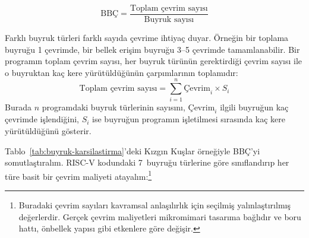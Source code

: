 \begin{equation}
\text{BBÇ} = \frac{\text{Toplam çevrim sayısı}}{\text{Buyruk sayısı}}
\label{eq:bbc}
\end{equation}

Farklı buyruk türleri farklı sayıda çevrime ihtiyaç duyar. Örneğin bir toplama buyruğu 1 çevrimde, bir bellek erişim buyruğu 3--5 çevrimde tamamlanabilir. Bir programın toplam çevrim sayısı, her buyruk türünün gerektirdiği çevrim sayısı ile o buyruktan kaç kere yürütüldüğünün çarpımlarının toplamıdır:
\begin{equation}
\text{Toplam çevrim sayısı} = \sum_{i=1}^{n} \text{Çevrim}_i \times S_i
\label{eq:toplam-cevrim}
\end{equation}
Burada $n$ programdaki buyruk türlerinin sayısını, $\text{Çevrim}_i$ ilgili buyruğun kaç çevrimde işlendiğini, $S_i$ ise buyruğun programın işletilmesi sırasında kaç kere yürütüldüğünü gösterir.

Tablo~\ref{tab:buyruk-karsilastirma}'deki Kızgın Kuşlar örneğiyle BBÇ'yi somutlaştıralım. RISC-V kodundaki 7~buyruğu türlerine göre sınıflandırıp her türe basit bir çevrim maliyeti atayalım:\footnote{Buradaki çevrim sayıları kavramsal anlaşılırlık için seçilmiş yalınlaştırılmış değerlerdir. Gerçek çevrim maliyetleri mikromimari tasarıma bağlıdır ve boru hattı, önbellek yapısı gibi etkenlere göre değişir.}

